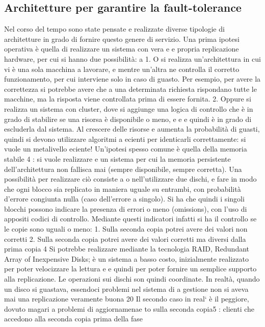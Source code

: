 \documentclass[a4paper,12pt]{article}
\begin{document}
\subsection{Architetture per garantire la fault-tolerance}
Nel corso del tempo sono state pensate e realizzate diverse tipologie di architetture in grado di fornire questo genere
di servizio.
Una prima ipotesi operativa è quella di realizzare un sistema con vera e
e
propria replicazione hardware, per cui si hanno due possibilità:
a
1. O si realizza un'architettura in cui vi è una sola macchina a lavorare,
e
mentre un'altra ne controlla il corretto funzionamento, per cui interviene
solo in caso di guasto. Per esempio, per avere la correttezza si potrebbe
avere che a una determinata richiesta rispondano tutte le macchine, ma
la risposta viene controllata prima di essere fornita.
2. Oppure si realizza un sistema con cluster, dove si aggiunge una logica di
controllo che è in grado di stabilire se una risorsa è disponibile o meno,
e
e
e quindi è in grado di escluderla dal sistema. Al crescere delle risorse
e
aumenta la probabilità di guasti, quindi si devono utilizzare algoritmi
a
ecienti per identicarli correttamente: si vuole un metalivello eciente!
Un'ipotesi spesso comune è quella della memoria stabile 4 : si vuole realizzare
e
un sistema per cui la memoria persistente dell'architettura non fallisca mai
(sempre disponibile, sempre corretta). Una possibilità per realizzare ciò consiste
a
o
nell'utilizzare due dischi, e fare in modo che ogni blocco sia replicato in maniera
uguale su entrambi, con probabilità d'errore congiunta nulla (caso dell'errore
a
singolo). Si ha che quindi i singoli blocchi possono indicare la presenza di errori
o meno (omissions), con l'uso di appositi codici di controllo. Mediante questi
indicatori infatti si ha il controllo se le copie sono uguali o meno:
1. Sulla seconda copia potrei avere dei valori non corretti
2. Sulla seconda copia potrei avere dei valori corretti ma diversi dalla prima
copia
4 Si potrebbe realizzare mediante la tecnologia RAID, Redundant Array of Inexpensive
Disks; è un sistema a basso costo, inizialmente realizzato per poter velocizzare la lettura e
e
quindi per poter fornire un semplice supporto alla replicazione. Le operazioni sui dischi son
quindi coordinate. In realtà, quando un disco si guastava, essendoci problemi nel sistema di
a
gestione non si aveva mai una replicazione veramente buona
20
Il secondo caso in real` è il peggiore, dovuto magari a problemi di aggiornamenae
to sulla seconda copia5 : clienti che accedono alla seconda copia prima della fase
\end{document}
